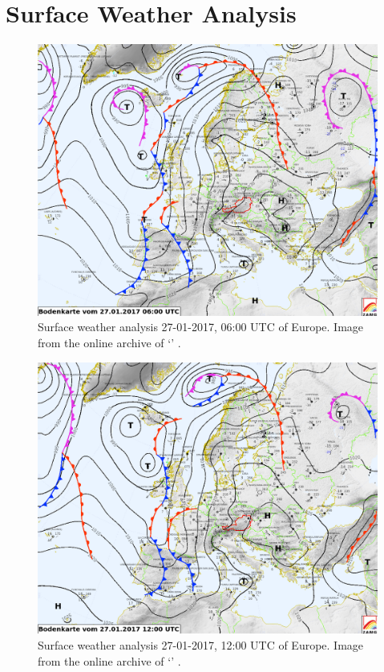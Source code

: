 \section{Surface Weather Analysis}
\begin{figure}[H]
    \centering
    \includegraphics[width=\textwidth]{graphics/Bodenkarte0600.png}
    \caption[Surface Weather Analysis 06:00 UTC]{Surface weather analysis 27-01-2017, 06:00 UTC of Europe. Image from the online archive of `\citeauthor{zamg}'  \cite{zamg}.}
    \label{fig: Bodenkarte06}
\end{figure}

\begin{figure}[H]
    \centering
    \includegraphics[width=\textwidth]{graphics/Bodenkarte1200.png}
    \caption[Surface Weather Analysis 12:00 UTC]{Surface weather analysis 27-01-2017, 12:00 UTC of Europe. Image from the online archive of `\citeauthor{zamg}'  \cite{zamg}.}
    \label{fig: Bodenkarte12}
\end{figure}